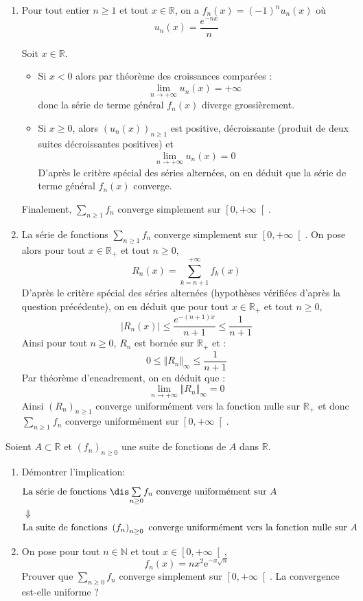 \documentclass[a4paper,10pt]{report}
\newcommand{\Sum}[2]{\ensuremath{\textstyle{\sum\limits_{#1}^{#2}}}}
\begin{document}
\corr \begin{enumerate}

\item Pour tout entier $n \geq 1$ et tout $x \in \mathbb{R}$, on a $f_n(x)=(-1)^nu_n(x)$ où 
$$u_n(x)=\dfrac{e^{-nx}}{n} $$

\noindent Soit $x \in \mathbb{R}$.
\begin{itemize}
\item Si $x<0$ alors par théorème des croissances comparées :
$$\lim\limits_{n\to +\infty}^{} u_n(x) =+\infty$$
donc la série de terme général $f_n(x)$ diverge grossièrement.
\item Si $x\geq 0$, alors $(u_n(x))_{n \geq 1}$ est positive, décroissante (produit de deux suites décroissantes positives) et 
$$\lim\limits_{n\to +\infty}^{}u_n(x)=0$$
D'après le critère spécial des séries alternées, on en déduit que la série de terme général $f_n(x)$ converge.
\end{itemize}
Finalement, $\Sum{n\geq 1}{} f_n$ converge simplement sur $\left[ 0,+\infty\right[$.
\item La série de fonctions $\Sum{n\geq 1}{} f_n$ converge simplement sur $\left[ 0,+\infty\right[ $. On pose alors pour tout $x \in \mathbb{R}_+$ et tout $n \geq 0$, 
$$ R_n(x)=\displaystyle\sum\limits_{k=n+1}^{+\infty}f_k(x)$$
D'après le critère spécial des séries alternées (hypothèses vérifiées d'après la question précédente), on en déduit que pour tout $x \in \mathbb{R}_+$ et tout $n \geq 0$,
$$|R_n(x)|\leq \dfrac{e^{-(n+1)x}}{n+1} \leq \dfrac{1}{n+1}$$
Ainsi pour tout $n \geq 0$, $R_n$ est bornée sur $\mathbb{R}_+$ et :
$$0 \leq \Vert R_n \Vert_{\infty}\leq \dfrac{1}{n+1}$$
Par théorème d'encadrement, on en déduit que :
$$ \lim_{n \rightarrow + \infty} \Vert R_n \Vert_{\infty} = 0$$
Ainsi $(R_n)_{n \geq 1}$ converge uniformément vers la fonction nulle sur $\mathbb{R}_+$ et donc $\Sum{n\geq 1}{}^{}f_n$ converge uniformément sur $\left[ 0,+\infty\right[ $.
\end{enumerate}

\medskip


\begin{Exercice}{} Soient $A\subset \mathbb{R}$ et $\left( f_{n}\right)_{n \geq 0}$ une suite de fonctions de $A$ dans $\mathbb{R}$.

\begin{enumerate}
\item D\'{e}montrer l'implication:
	\begin{eqnarray*}
	&  \text{La s\'{e}rie de fonctions }\dis \Sum{n\geq 0}{} f_n\ \text{converge uniform\'{e}ment sur $A$}& \\
	&\Downarrow &\\
	&\text{La suite de fonctions\ }\left( f_{n}\right) _{n \geq 0}\ \text{converge uniform\'{e}ment vers la fonction nulle sur $A$}&
	\end{eqnarray*}
\item
On pose pour tout $n\in\mathbb{N}$ et tout $x\in\left[ 0,+\infty\right[ $, 
$$f_n(x)=nx^2\mathrm{e}^{-x\sqrt{n}}$$
Prouver que $\Sum{n\geq 0}{} f_n$ converge simplement sur $\left[ 0,+\infty\right[$. La convergence est-elle uniforme ?
\end{enumerate}
\end{Exercice}
\end{document}
